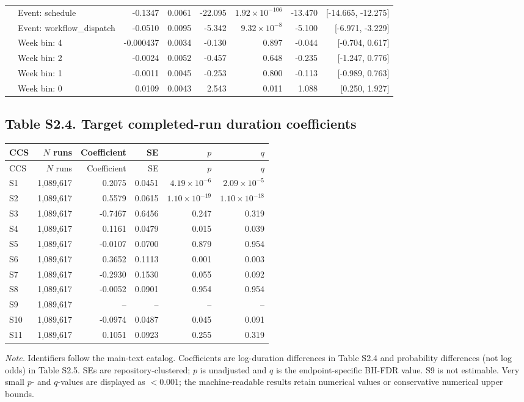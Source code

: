 \documentclass{article}
\begin{document}
\begin{longtable}{>{\raggedright\arraybackslash}p{2.4cm}>{\raggedright\arraybackslash}p{3.8cm}rrrrrr}
 & Event: schedule & -0.1347 & 0.0061 & -22.095 & $1.92\times10^{-106}$ & -13.470 & [-14.665, -12.275] \\
 & Event: workflow\_dispatch & -0.0510 & 0.0095 & -5.342 & $9.32\times10^{-8}$ & -5.100 & [-6.971, -3.229] \\
 & Week bin: 4 & -0.000437 & 0.0034 & -0.130 & 0.897 & -0.044 & [-0.704, 0.617] \\
 & Week bin: 2 & -0.0024 & 0.0052 & -0.457 & 0.648 & -0.235 & [-1.247, 0.776] \\
 & Week bin: 1 & -0.0011 & 0.0045 & -0.253 & 0.800 & -0.113 & [-0.989, 0.763] \\
 & Week bin: 0 & 0.0109 & 0.0043 & 2.543 & 0.011 & 1.088 & [0.250, 1.927] \\
\bottomrule\end{longtable}
\subsection*{Table S2.4. Target completed-run duration coefficients}
\footnotesize\begin{longtable}{lrrrrr}
\toprule CCS & $N$ runs & Coefficient & SE & $p$ & $q$ \\\midrule\endfirsthead
\toprule CCS & $N$ runs & Coefficient & SE & $p$ & $q$ \\\midrule\endhead
S1 & 1,089,617 & 0.2075 & 0.0451 & $4.19\times10^{-6}$ & $2.09\times10^{-5}$ \\
S2 & 1,089,617 & 0.5579 & 0.0615 & $1.10\times10^{-19}$ & $1.10\times10^{-18}$ \\
S3 & 1,089,617 & -0.7467 & 0.6456 & 0.247 & 0.319 \\
S4 & 1,089,617 & 0.1161 & 0.0479 & 0.015 & 0.039 \\
S5 & 1,089,617 & -0.0107 & 0.0700 & 0.879 & 0.954 \\
S6 & 1,089,617 & 0.3652 & 0.1113 & 0.001 & 0.003 \\
S7 & 1,089,617 & -0.2930 & 0.1530 & 0.055 & 0.092 \\
S8 & 1,089,617 & -0.0052 & 0.0901 & 0.954 & 0.954 \\
S9 & 1,089,617 & -- & -- & -- & -- \\
S10 & 1,089,617 & -0.0974 & 0.0487 & 0.045 & 0.091 \\
S11 & 1,089,617 & 0.1051 & 0.0923 & 0.255 & 0.319 \\
\bottomrule\end{longtable}
\noindent\textit{Note.} Identifiers follow the main-text catalog. Coefficients are log-duration differences in Table S2.4 and probability differences (not log odds) in Table S2.5. SEs are repository-clustered; $p$ is unadjusted and $q$ is the endpoint-specific BH-FDR value. S9 is not estimable. Very small $p$- and $q$-values are displayed as $<0.001$; the machine-readable results retain numerical values or conservative numerical upper bounds.
\end{document}
